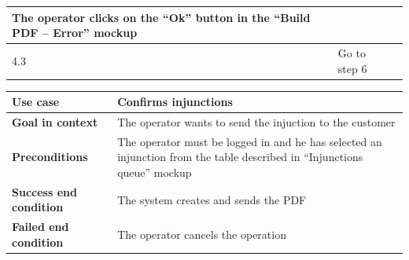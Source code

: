 {{{\begin{table}[h]
\begin{tabular}{|p{2cm}|p{6cm}|p{6cm}|}
				\vspace{1mm} The operator clicks on the “Ok” button in the “Build PDF – Error” mockup\vspace{1mm} & 
				\vspace{1mm} \vspace{1mm} \\
			\hline
				\vspace{1mm} 4.3\vspace{1mm} &
				\vspace{1mm} Go to step 6\vspace{1mm} & 
				\vspace{1mm} \vspace{1mm} \\
			\hline
			\end{tabular}
			\end{table}
			
			\clearpage
	
			\begin{table}[h]
			\begin{tabular}{|p{4cm}|p{10cm}|}
			\hline
				\centering \vspace{1mm} \bfseries{Use case} \vspace{1mm} & 
				\vspace{1mm} Confirms injunctions\vspace{1mm}\\
			\hline
				\centering \vspace{1mm} \bfseries{Goal in context} \vspace{1mm} & 
				\vspace{1mm} The operator wants to send the injuction to the customer \vspace{1mm}\\
			\hline
				\centering \vspace{1mm} \bfseries{Preconditions} \vspace{1mm} & 
				\vspace{1mm} The operator must be logged in and he has selected an injunction from the table described in “Injunctions queue” mockup\vspace{1mm}\\
			\hline
				\centering \vspace{1mm} \bfseries{Success end condition} \vspace{1mm} & 
				\vspace{1mm} The system creates and sends the PDF\vspace{1mm}\\
			\hline
				\centering \vspace{1mm} \bfseries{Failed end condition} \vspace{1mm} & 
				\vspace{1mm} The operator cancels the operation 


\end{tabular}
\end{table}}}}
